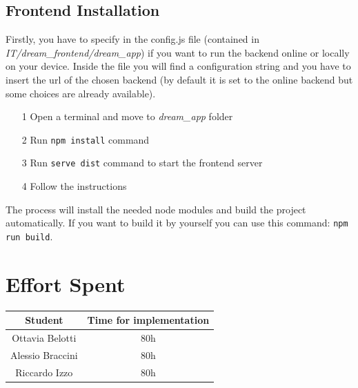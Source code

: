 \documentclass[table, 12pt]{article}
\begin{document}
\subsection{Frontend Installation}
Firstly, you have to specify in the config.js file (contained in \newline \textit{IT/dream\_frontend/dream\_app}) if you want to run the backend online or locally on your device.
Inside the file you will find a configuration string and you have to insert the url of the chosen backend
(by default it is set to the online backend but some choices are already available).

\begin{itemize}
    \item [1] Open a terminal and move to \textit{dream\_app} folder
    \item [2] Run \texttt{npm install} command
    \item [3] Run \texttt{serve dist} command to start the frontend server
    \item [4] Follow the instructions
\end{itemize}

The process will install the needed node modules and build the project automatically.
If you want to build it by yourself you can use this command: \texttt{npm run build}.

\section{Effort Spent}
\begin{tabular}{|c||c|}
    \hline
    Student & Time for implementation\\ \hline
    Ottavia Belotti & 80h\\
    Alessio Braccini & 80h\\
    Riccardo Izzo & 80h\\
    \hline
\end{tabular}
\end{document}
